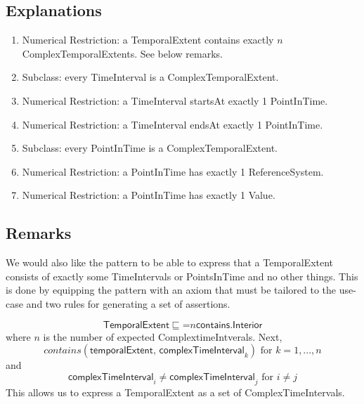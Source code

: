 \subsection{Explanations}
\label{exp:Temporal}
\begin{enumerate}
\item Numerical Restriction: a \textsf{TemporalExtent} \textsf{contains} exactly $n$ \textsf{ComplexTemporalExtents}. See below remarks.
\item Subclass: every \textsf{TimeInterval} is a \textsf{ComplexTemporalExtent}.
\item Numerical Restriction: a \textsf{TimeInterval} \textsf{startsAt} exactly 1 \textsf{PointInTime}.
\item Numerical Restriction: a \textsf{TimeInterval} \textsf{endsAt} exactly 1 \textsf{PointInTime}.
\item Subclass: every \textsf{PointInTime} is a \textsf{ComplexTemporalExtent}.
\item Numerical Restriction: a \textsf{PointInTime} has exactly 1 \textsf{ReferenceSystem}.
\item Numerical Restriction: a \textsf{PointInTime} has exactly 1 \textsf{Value}.
\end{enumerate}

\subsection{Remarks}
\label{rem:Temporal}
We would also like the pattern to be able to express that a \textsf{TemporalExtent} consists of exactly some \textsf{TimeIntervals} or \textsf{PointsInTime} and no other things. This is done by equipping the pattern with an axiom that must be tailored to the use-case and two rules for generating a set of assertions.

\begin{equation}
\textsf{TemporalExtent} \sqsubseteq \mathord{=}n\textsf{contains.Interior}
\end{equation}
where $n$ is the number of expected \textsf{ComplextimeIntverals}. Next,
$$\textit{contains}(\textsf{temporalExtent, complexTimeInterval}_k) \text{ for } k=1,...,n$$
and
$$\textsf{complexTimeInterval}_i \not = \textsf{complexTimeInterval}_j \text{ for } i \not = j$$
This allows us to express a \textsf{TemporalExtent} as a set of \textsf{ComplexTimeIntervals}.

